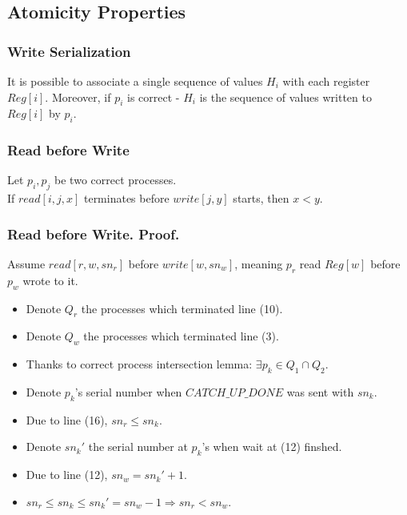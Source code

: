 \subsection{Atomicity Properties}
\begin{frame}
    \frametitle{Write Serialization}
    \begin{lemma}
        It is possible to associate a single sequence of values $H_i$
        with each register $Reg[i]$. Moreover, if $p_i$ is correct -
        $H_i$ is the sequence of values written to $Reg[i]$ by $p_i$.
    \end{lemma}
\end{frame}
\begin{frame}
    \frametitle{Read before Write}
    \begin{lemma}
        Let $p_i, p_j$ be two correct processes.\\
        If $read[i,j,x]$ terminates before $write[j,y]$ starts, then $x<y$.
    \end{lemma}
\end{frame}
\begin{frame}
    \frametitle{Read before Write. Proof.}

        Assume $read[r,w,sn_r]$ before $write[w,sn_w]$, meaning $p_r$ read $Reg[w]$
        before $p_w$ wrote to it.
        \begin{itemize}
            \item Denote $Q_r$ the processes which terminated line (10).
            \item Denote $Q_w$ the processes which terminated line (3).
            \item Thanks to correct process intersection lemma: $\exists p_k\in Q_1\cap Q_2$.
            \item Denote $p_k$'s serial number when $CATCH\_UP\_DONE$ was sent with $sn_k$. 
            \item Due to line (16), $sn_r\leq sn_k$.
            \item Denote $sn_k'$ the serial number at $p_k$'s when wait at (12) finshed.
            \item Due to line (12), $sn_w=sn_k'+1$.
            \item $sn_r\leq sn_k\leq sn_k'= sn_w-1\Rightarrow sn_r < sn_w$.
        \end{itemize}
\end{frame}
